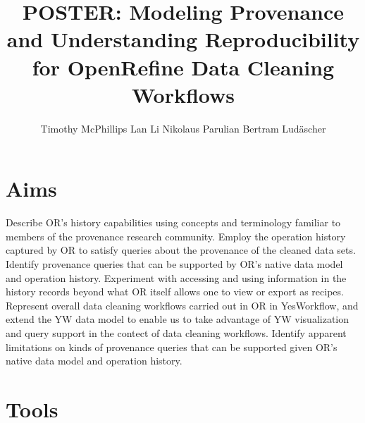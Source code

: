 \documentclass[sigconf,screen,nonacm]{acmart}
\begin{document}
\title[Reproducible Data Cleaning]{POSTER: Modeling
  Provenance and Understanding Reproducibility for OpenRefine Data
  Cleaning Workflows}

\author{Timothy McPhillips \qquad Lan Li \qquad Nikolaus Parulian \qquad Bertram Lud\"ascher}
 

\maketitle



\section{Aims}

Describe OR's history capabilities using concepts and terminology familiar to members of the provenance research community.
Employ the operation history captured by OR to satisfy queries about the provenance of the cleaned data sets.
Identify provenance queries that can be supported by OR's native data model and operation history. 
Experiment with accessing and using information in the history records beyond what OR itself allows one to view or export as recipes.
Represent overall data cleaning workflows carried out in OR in YesWorkflow, and extend the YW data model to enable us to take advantage of YW visualization and query support in the contect of data cleaning workflows.
Identify apparent limitations on kinds of provenance queries that can be supported given OR's native data model and operation history. 

\section{Tools}
\end{document}
